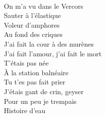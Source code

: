 \\
On m'a vu dans le Vercors \\
Sauter à l'élastique \\
Voleur d'amphores \\
Au fond des criques \\
J'ai fait la cour à des murènes \\
J'ai fait l'amour, j'ai fait le mort \\
T'étais pas née \\
À la station balnéaire \\
Tu t'es pas fait prier \\
J'étais gant de crin, geyser \\
Pour un peu je trempais \\
Histoire d'eau \\
